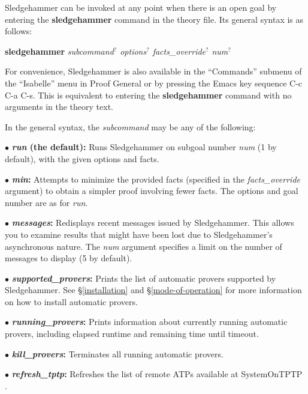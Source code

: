 \documentclass[a4paper,12pt]{article}
\begin{document}
Sledgehammer can be invoked at any point when there is an open goal by entering
the \textbf{sledgehammer} command in the theory file. Its general syntax is as
follows:

\prew
\textbf{sledgehammer} \textit{subcommand\/$^?$ options\/$^?$ facts\_override\/$^?$ num\/$^?$}
\postw

For convenience, Sledgehammer is also available in the ``Commands'' submenu of
the ``Isabelle'' menu in Proof General or by pressing the Emacs key sequence C-c
C-a C-s. This is equivalent to entering the \textbf{sledgehammer} command with
no arguments in the theory text.

In the general syntax, the \textit{subcommand} may be any of the following:

\begin{enum}
\item[$\bullet$] \textbf{\textit{run} (the default):} Runs Sledgehammer on
subgoal number \textit{num} (1 by default), with the given options and facts.

\item[$\bullet$] \textbf{\textit{min}:} Attempts to minimize the provided facts
(specified in the \textit{facts\_override} argument) to obtain a simpler proof
involving fewer facts. The options and goal number are as for \textit{run}.

\item[$\bullet$] \textbf{\textit{messages}:} Redisplays recent messages issued
by Sledgehammer. This allows you to examine results that might have been lost
due to Sledgehammer's asynchronous nature. The \textit{num} argument specifies a
limit on the number of messages to display (5 by default).

\item[$\bullet$] \textbf{\textit{supported\_provers}:} Prints the list of
automatic provers supported by Sledgehammer. See \S\ref{installation} and
\S\ref{mode-of-operation} for more information on how to install automatic
provers.

\item[$\bullet$] \textbf{\textit{running\_provers}:} Prints information about
currently running automatic provers, including elapsed runtime and remaining
time until timeout.

\item[$\bullet$] \textbf{\textit{kill\_provers}:} Terminates all running
automatic provers.

\item[$\bullet$] \textbf{\textit{refresh\_tptp}:} Refreshes the list of remote
ATPs available at System\-On\-TPTP \cite{sutcliffe-2000}.
\end{enum}
\end{document}
